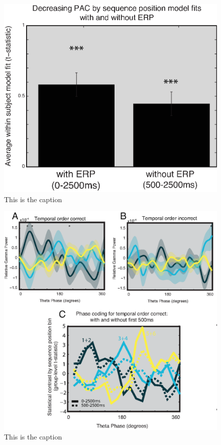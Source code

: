 \begin{figure}[htbp]
\centering
\includegraphics{figures/chapter3_suppfigure9}
\caption{This is the caption}
\end{figure}

\begin{figure}[htbp]
\centering
\includegraphics{figures/chapter3_suppfigure10}
\caption{This is the caption}
\end{figure}


